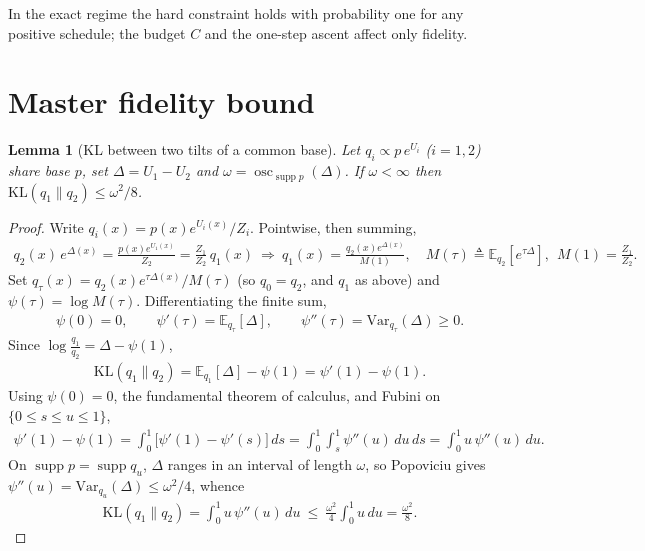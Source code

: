 \documentclass[11pt]{article}
\newcommand{\KL}{\mathrm{KL}}
\newcommand{\E}{\mathbb{E}}
\newcommand{\Var}{\mathrm{Var}}
\DeclareMathOperator*{\osc}{osc}
\theoremstyle{plain}
\newtheorem{lemma}{Lemma}
\theoremstyle{definition}
\theoremstyle{remark}
\begin{document}
In the exact regime the hard constraint holds with probability one for any positive
schedule; the budget $C$ and the one-step ascent affect only fidelity.

\section{Master fidelity bound}
\label{sec:master}

\begin{lemma}[KL between two tilts of a common base]
\label{lem:osc}
Let $q_i\propto p\,e^{U_i}$ ($i=1,2$) share base $p$, set $\Delta=U_1-U_2$ and
$\omega=\osc_{\operatorname{supp}p}(\Delta)$. If $\omega<\infty$ then $\KL(q_1\|q_2)\le\omega^2/8$.
\end{lemma}
\begin{proof}
Write $q_i(x)=p(x)e^{U_i(x)}/Z_i$. Pointwise, then summing,
\begin{gather*}
q_2(x)\,e^{\Delta(x)}=\frac{p(x)e^{U_1(x)}}{Z_2}=\frac{Z_1}{Z_2}\,q_1(x)
\ \Longrightarrow\
q_1(x)=\frac{q_2(x)e^{\Delta(x)}}{M(1)},\quad M(\tau)\triangleq\E_{q_2}[e^{\tau\Delta}],\ \ M(1)=\tfrac{Z_1}{Z_2}.
\end{gather*}
Set $q_\tau(x)=q_2(x)e^{\tau\Delta(x)}/M(\tau)$ (so $q_0=q_2$, and $q_1$ as above) and $\psi(\tau)=\log M(\tau)$. Differentiating the finite sum,
\begin{gather*}
\psi(0)=0,\qquad
\psi'(\tau)=\E_{q_\tau}[\Delta],\qquad
\psi''(\tau)=\Var_{q_\tau}(\Delta)\ge0.
\end{gather*}
Since $\log\tfrac{q_1}{q_2}=\Delta-\psi(1)$,
\begin{gather*}
\KL(q_1\|q_2)=\E_{q_1}[\Delta]-\psi(1)=\psi'(1)-\psi(1).
\end{gather*}
Using $\psi(0)=0$, the fundamental theorem of calculus, and Fubini on $\{0\le s\le u\le1\}$,
\begin{gather*}
\psi'(1)-\psi(1)=\int_0^1\!\big[\psi'(1)-\psi'(s)\big]\,ds
=\int_0^1\!\!\int_s^1\psi''(u)\,du\,ds
=\int_0^1 u\,\psi''(u)\,du.
\end{gather*}
On $\operatorname{supp}p=\operatorname{supp}q_u$, $\Delta$ ranges in an interval of length $\omega$, so Popoviciu gives $\psi''(u)=\Var_{q_u}(\Delta)\le\omega^2/4$, whence
\begin{gather*}
\KL(q_1\|q_2)=\int_0^1 u\,\psi''(u)\,du\ \le\ \frac{\omega^2}{4}\int_0^1 u\,du=\frac{\omega^2}{8}.
\end{gather*}
\end{proof}
\end{document}
